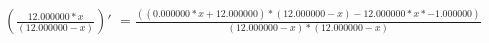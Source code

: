 \documentclass[a4paper, 12 pt]{article}
\begin{document}
	$\left(\frac{12.000000*x}{(12.000000-x)}\right)'$
	$= \frac{((0.000000*x+12.000000)*(12.000000-x)-12.000000*x*-1.000000)}{(12.000000-x)*(12.000000-x)}$
\end{document}
